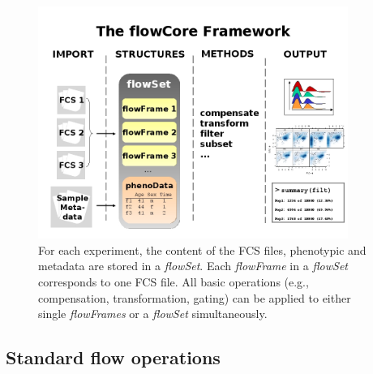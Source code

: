 \documentclass[12pt]{article}
\newcommand{\Rclass}[1]{{\textit{#1}}}
\begin{document}
\begin{singlespace}
\begin{figure}
\centering
\includegraphics[width=0.9\textwidth]{Figure1-flowCoreFrameWork.jpg}
\caption{\label{fig1:FrameWork}{For each experiment, the content of
    the FCS files, phenotypic and metadata are stored in a
    \Rclass{flowSet}. Each \Rclass{flowFrame} in a \Rclass{flowSet}
    corresponds to one FCS file. All basic operations (e.g.,
    compensation, transformation, gating) can be applied to either
    single \Rclass{flowFrames} or a \Rclass{flowSet} simultaneously.}}
\end{figure}
\end{singlespace}




\subsection*{Standard flow operations}
\end{document}
